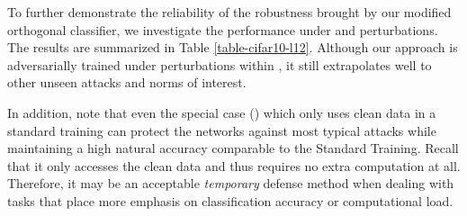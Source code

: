 \documentclass[preprint,review,12pt]{elsarticle}
\numberwithin{equation}{section}
\begin{document}
\begin{table}[!htb]
	\center
	\caption{Comparison of classification accuracy (\%) on FashionMNIST
	over  perturbations within ,  and , respectively.
	}
	\label{table-fashionmnist-l12inf}
\end{table}



To further demonstrate the reliability of the robustness brought by our modified orthogonal classifier,
we investigate the performance under  and  perturbations.
The results are summarized in Table \ref{table-cifar10-l12}.
Although our approach is adversarially trained under  perturbations within ,
it still extrapolates well to other unseen attacks and norms of interest.

In addition, note that even the special case () which only uses clean data in a standard training  can protect the networks against most typical attacks
while maintaining a  high natural accuracy comparable to the Standard Training.
Recall that it only accesses the clean data and thus requires no extra computation at all.
Therefore, it may be an acceptable \textit{temporary} defense method
when dealing with tasks that place more emphasis on classification accuracy or computational load.
\end{document}

